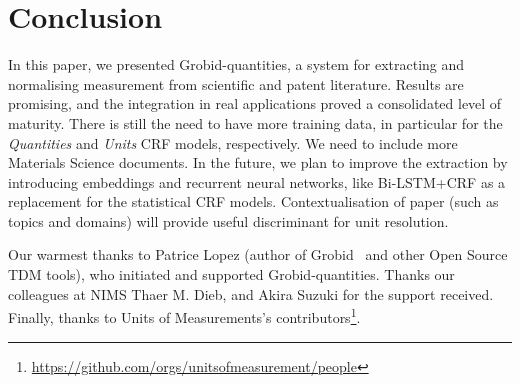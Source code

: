 \documentclass[sigconf]{acmart}
\begin{document}
\section{Conclusion}
\label{sec:conclusion}
In this paper, we presented Grobid-quantities, a system for extracting and normalising measurement from scientific and patent literature. Results are promising, and the integration in real applications proved a consolidated level of maturity. There is still the need to have more training data, in particular for the \textit{Quantities} and \textit{Units} CRF models, respectively. We need to include more Materials Science documents. In the future, we plan to improve the extraction by introducing embeddings and recurrent neural networks, like Bi-LSTM+CRF as a replacement for the statistical CRF models. Contextualisation of paper (such as topics and domains) will provide useful discriminant for unit resolution. 

\begin{acks}
Our warmest thanks to Patrice Lopez (author of Grobid~\cite{GROBID} and other Open Source TDM tools), who initiated and supported Grobid-quantities. Thanks our colleagues at NIMS Thaer M. Dieb, and Akira Suzuki for the support received. Finally, thanks to Units of Measurements's contributors\footnote{\url{https://github.com/orgs/unitsofmeasurement/people}}.
\end{acks}




\end{document}
